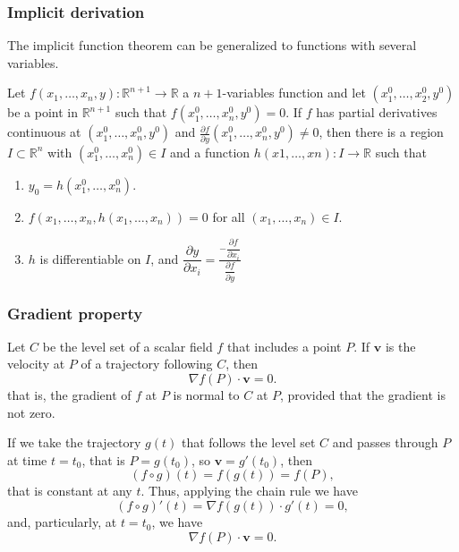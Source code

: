\begin{frame}
\frametitle{Implicit derivation}
The implicit function theorem can be generalized to functions with several variables.

\begin{theorem}
Let $f(x_1,\ldots,x_n,y):\mathbb{R}^{n+1}\longrightarrow \mathbb{R}$ a $n+1$-variables function and let $(x_1^0,\ldots, x_2^0,y^0)$ be a point in $\mathbb{R}^{n+1}$ such that $f(x_1^0,\ldots,x_n^0,y^0)=0$.
If $f$ has partial derivatives continuous at $(x_1^0,\ldots,x_n^0,y^0)$ and $\frac{\partial f}{\partial y}(x_1^0,\ldots,x_n^0,y^0)\neq 0$, then there is a region $I\subset \mathbb{R}^n$ with $(x_1^0,\ldots,x_n^0)\in I$ and a function $h(x1,\ldots, xn): I\longrightarrow \mathbb{R}$ such that
\begin{enumerate}
\item $y_0=h(x_1^0,\ldots,x_n^0)$.
\item $f(x_1,\ldots,x_n,h(x_1,\ldots,x_n))=0$ for all $(x_1,\ldots,x_n)\in I$.
\item $h$ is differentiable on $I$, and $\dfrac{\partial y}{\partial x_i}=\frac{-\dfrac{\partial f}{\partial x_i}}{\dfrac{\partial f}{\partial y}}$
\end{enumerate}
\end{theorem}
\end{frame}


\begin{frame}
\frametitle{Gradient property}
\begin{theorem}
Let $C$ be the level set of a scalar field $f$ that includes a point $P$.
If $\mathbf{v}$ is the velocity at $P$ of a trajectory following $C$, then
\[
\nabla f(P) \cdot \mathbf{v} = 0.
\]
that is, the gradient of $f$ at $P$ is normal to $C$ at $P$, provided that the gradient is not zero.
\end{theorem}

If we take the trajectory $g(t)$ that follows the level set $C$ and passes through $P$ at time $t=t_0$, that is $P=g(t_0)$, so $\mathbf{v}=g'(t_0)$, then
\[
(f\circ g)(t) = f(g(t)) = f(P),
\]
that is constant at any $t$.
Thus, applying the chain rule we have
\[
(f\circ g)'(t) = \nabla f(g(t))\cdot  g'(t) = 0,
\]
and, particularly, at $t=t_0$, we have
\[
\nabla f(P)\cdot \mathbf{v} = 0.
\]
\end{frame}


